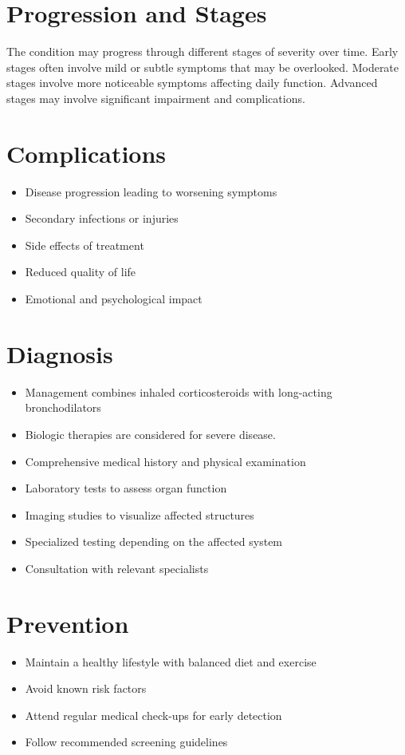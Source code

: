 \section{Progression and Stages}
The condition may progress through different stages of severity over time. Early stages often involve mild or subtle symptoms that may be overlooked. Moderate stages involve more noticeable symptoms affecting daily function. Advanced stages may involve significant impairment and complications.
\section{Complications}
\begin{itemize}[noitemsep]
  \item Disease progression leading to worsening symptoms
  \item Secondary infections or injuries
  \item Side effects of treatment
  \item Reduced quality of life
  \item Emotional and psychological impact
\end{itemize}
\section{Diagnosis}
\begin{itemize}[noitemsep]
  \item Management combines inhaled corticosteroids with long-acting bronchodilators
  \item Biologic therapies are considered for severe disease.
  \item Comprehensive medical history and physical examination
  \item Laboratory tests to assess organ function
  \item Imaging studies to visualize affected structures
  \item Specialized testing depending on the affected system
  \item Consultation with relevant specialists
\end{itemize}
\section{Prevention}
\begin{itemize}[noitemsep]
  \item Maintain a healthy lifestyle with balanced diet and exercise
  \item Avoid known risk factors
  \item Attend regular medical check-ups for early detection
  \item Follow recommended screening guidelines
\end{itemize}
